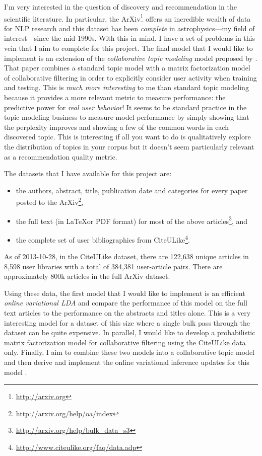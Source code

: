 \documentclass[11pt]{article}
\begin{document}
I'm very interested in the question of discovery and recommendation in the
scientific literature.
In particular, the ArXiv\footnote{\url{http://arxiv.org}} offers an incredible
wealth of data for NLP research and this dataset has been \emph{complete} in
astrophysics---my field of interest---since the mid-1990s.
With this in mind, I have a set of problems in this vein that I aim to
complete for this project.
The final model that I would like to implement is an extension of the
\emph{collaborative topic modeling} model proposed by \citet{blei}.
That paper combines a standard topic model with a matrix factorization model
of collaborative filtering in order to explicitly consider user activity when
training and testing.
This is \emph{much more interesting} to me than standard topic modeling
because it provides a more relevant metric to measure performance:
the predictive power for \emph{real user behavior}!
It seems to be standard practice in the topic modeling business to measure
model performance by simply showing that the perplexity improves and showing a
few of the common words in each discovered topic.
This is interesting if all you want to do is qualitatively explore the
distribution of topics in your corpus but it doesn't seem particularly
relevant as a recommendation quality metric.

The datasets that I have available for this project are:
\begin{itemize}
\item{the authors, abstract, title, publication date and categories for
      every paper posted to the
      ArXiv\footnote{\url{http://arxiv.org/help/oa/index}},}
\item{the full text (in \LaTeX or PDF format) for most of the above
      articles\footnote{\url{http://arxiv.org/help/bulk_data_s3}}, and}
\item{the complete set of user bibliographies from
      CiteULike\footnote{\url{http://www.citeulike.org/faq/data.adp}}.}
\end{itemize}
As of 2013-10-28, in the CiteULike dataset, there are 122,638 unique articles
in 8,598 user libraries with a total of 384,381 user-article pairs.
There are approximately 800k articles in the full ArXiv dataset.

Using these data, the first model that I would like to implement is an
efficient \emph{online variational LDA} \citep{ovlda} and compare the
performance of this model on the full text articles to the performance on the
abstracts and titles alone.
This is a very interesting model for a dataset of this size where a single
bulk pass through the dataset can be quite expensive.
In parallel, I would like to develop a probabilistic matrix factorization
model \citep{pmf} for collaborative filtering using the CiteULike data only.
Finally, I aim to combine these two models into a collaborative topic model
and then derive and implement the online variational inference updates for
this model \citep[following][]{ov}.
\end{document}
